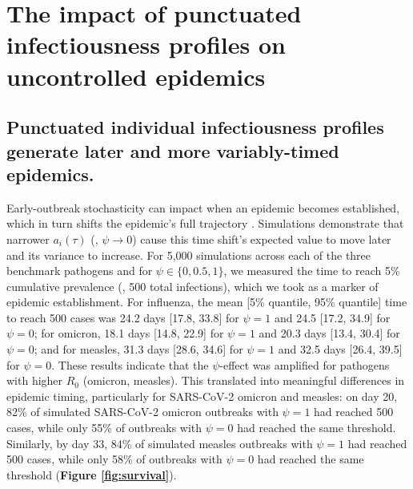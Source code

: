 \clearpage 

\section{The impact of punctuated infectiousness profiles on uncontrolled epidemics}

\subsection{Punctuated individual infectiousness profiles generate later and more variably-timed epidemics.}

Early-outbreak stochasticity can impact when an epidemic becomes established, which in turn shifts the epidemic's full trajectory \citep{morris_computation_2024}. Simulations demonstrate that narrower $a_i(\tau)$ (\ie, $\psi \rightarrow 0$) cause this time shift's expected value to move later and its variance to increase. For 5,000 simulations across each of the three benchmark pathogens and for $\psi \in \{0, 0.5, 1\}$, we measured the time to reach 5\% cumulative prevalence (\ie, 500 total infections), which we took as a marker of epidemic establishment. For influenza, the mean [5\% quantile, 95\% quantile] time to reach 500 cases was 24.2 days [17.8, 33.8] for $\psi = 1$ and 24.5 [17.2, 34.9] for $\psi = 0$; for omicron, 18.1 days [14.8, 22.9] for $\psi = 1$ and 20.3 days [13.4, 30.4] for $\psi = 0$; and for measles, 31.3 days [28.6, 34.6] for $\psi = 1$ and 32.5 days [26.4, 39.5] for $\psi = 0$. These results indicate that the $\psi$-effect was amplified for pathogens with higher $R_0$ (omicron, measles). This translated into meaningful differences in epidemic timing, particularly for SARS-CoV-2 omicron and measles: on day 20, 82\% of simulated SARS-CoV-2 omicron outbreaks with $\psi = 1$ had reached 500 cases, while only 55\% of outbreaks with $\psi = 0$ had reached the same threshold. Similarly, by day 33, 84\% of simulated measles outbreaks with $\psi = 1$ had reached 500 cases, while only 58\% of outbreaks with $\psi = 0$ had reached the same threshold ({\bf Figure \ref{fig:survival}}). 


